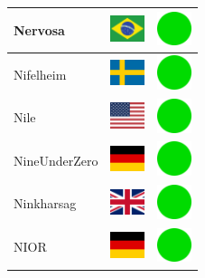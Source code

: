 \documentclass[12pt, a4paper, twoside]{report}
\begin{document}
\begin{center}
\begin{longtable}{|p{5cm}|p{2cm}|p{2cm}|}
 Nervosa                                                    & \includegraphics[width=1cm]{../4x3/br} &   \includegraphics[width=1cm]{../likes/y} \\ \hline
 Nifelheim                                                  & \includegraphics[width=1cm]{../4x3/se} &   \includegraphics[width=1cm]{../likes/y} \\ \hline
 Nile                                                       & \includegraphics[width=1cm]{../4x3/us} &   \includegraphics[width=1cm]{../likes/y} \\ \hline
 NineUnderZero                                              & \includegraphics[width=1cm]{../4x3/de} &   \includegraphics[width=1cm]{../likes/y} \\ \hline
 Ninkharsag                                                 & \includegraphics[width=1cm]{../4x3/gb} &   \includegraphics[width=1cm]{../likes/y} \\ \hline
 NIOR                                                       & \includegraphics[width=1cm]{../4x3/de} &   \includegraphics[width=1cm]{../likes/y} \\ \hline

\end{longtable}
\end{center}
\end{document}
